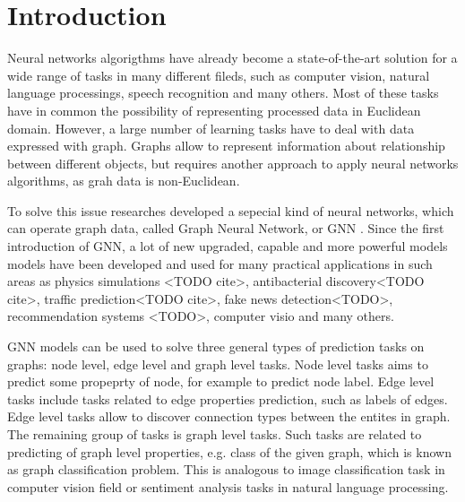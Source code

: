 \section{Introduction}


Neural networks algorigthms have already become a state-of-the-art solution for a wide range of tasks
in many different fileds, such as computer vision, natural language processings, speech recognition and many others.
Most of these tasks have in common the possibility of representing processed data in Euclidean domain. However,
a large number of learning tasks have to deal with data expressed with graph. Graphs allow 
to represent information about relationship between different objects, but requires another approach 
to apply neural networks algorithms, as grah data is non-Euclidean. 

To solve this issue researches developed a sepecial kind of neural networks, which can operate graph data, called 
Graph Neural Network, or GNN \cite{GNN}. Since the first introduction of GNN, a lot of new upgraded, capable and more powerful 
models models have been developed and used for many practical applications in such areas as
physics simulations <TODO cite>,  antibacterial discovery<TODO cite>,  traffic prediction<TODO cite>, fake news detection<TODO>, 
recommendation systems <TODO>, computer visio and many others. 





GNN models can be used to solve three general types of prediction tasks on graphs: 
node level, edge level and graph level tasks. Node level tasks aims to predict some propeprty of node, for example
to predict node label. Edge level tasks include tasks related to edge properties prediction, such as labels of edges. 
Edge level tasks allow to discover connection types between the entites in graph. The remaining group of tasks is graph level tasks.
Such tasks are related to predicting of graph level properties, e.g. class of the given graph, which is known as
graph classification problem. This is analogous to image classification task in computer vision field or
sentiment analysis tasks in natural language processing.


